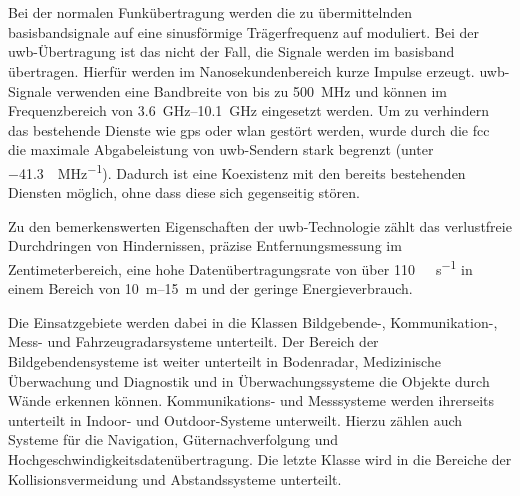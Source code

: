 %
%
\chapter{}
\label{ch:uwb}

Bei der normalen Funkübertragung werden die zu übermittelnden \Gls{basisband}signale auf eine sinusförmige Trägerfrequenz auf moduliert. Bei der \Gls{uwb}-Übertragung ist das nicht der Fall, die Signale werden im \Gls{basisband} übertragen. Hierfür werden im Nanosekundenbereich kurze Impulse erzeugt. \Gls{uwb}-Signale verwenden eine Bandbreite von bis zu \SI{500}{\MHz} und können im Frequenzbereich von \SIrange{3.6}{10.1}{\GHz} eingesetzt werden. Um zu verhindern das bestehende Dienste wie \Gls{gps} oder \Gls{wlan} gestört werden, wurde durch die \Gls{fcc} die maximale Abgabeleistung von \Gls{uwb}-Sendern stark begrenzt (unter \SI[per-mode=symbol]{-41.3}{\dBm\per\MHz}). Dadurch ist eine Koexistenz mit den bereits bestehenden Diensten möglich, ohne dass diese sich gegenseitig stören. \cite{win1998impulse, yang2004uwbcom, fontana2004recent, aiello2006ultra, yavari2014ultra}

Zu den bemerkenswerten Eigenschaften der \Gls{uwb}-Technologie zählt das verlustfreie Durchdringen von Hindernissen, präzise Entfernungsmessung im Zentimeterbereich, eine hohe Datenübertragungsrate von über \SI[per-mode=symbol]{110}{\mega\byte\per\second} in einem Bereich von \SIrange{10}{15}{\metre} und der geringe Energieverbrauch. \cite{yang2004uwbcom}

Die Einsatzgebiete werden dabei in die Klassen Bildgebende-, Kommunikation-, Mess- und Fahrzeugradarsysteme unterteilt. Der Bereich der Bildgebendensysteme ist weiter unterteilt in Bodenradar, Medizinische Überwachung und Diagnostik und in Überwachungssysteme die Objekte durch Wände erkennen können. Kommunikations- und Messsysteme werden ihrerseits unterteilt in Indoor- und Outdoor-Systeme unterweilt. Hierzu zählen auch Systeme für die Navigation, Güternachverfolgung und Hochgeschwindigkeitsdatenübertragung. Die letzte Klasse wird in die Bereiche der Kollisionsvermeidung und Abstandssysteme unterteilt. \cite{yang2004uwbcom, lakkundi2006ultra, pan2007medical}


%
%
%
